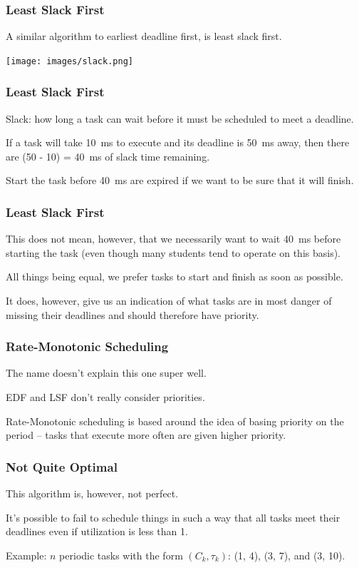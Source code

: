 \begin{frame}
\frametitle{Least Slack First}

A similar algorithm to earliest deadline first, is least slack first.

\begin{center}
	\texttt{[image: images/slack.png]}
\end{center}


\end{frame}

\begin{frame}
\frametitle{Least Slack First}

\alert{Slack}: how long a task can wait before it must be scheduled to meet a deadline.

If a task will take 10~ms to execute and its deadline is 50~ms away, then there are (50 - 10) = 40~ms of slack time remaining.

Start the task before 40~ms are expired if we want to be sure that it will finish. 

\end{frame}

\begin{frame}
\frametitle{Least Slack First}
This does not mean, however, that we necessarily want to wait 40~ms before starting the task (even though many students tend to operate on this basis). 

All things being equal, we prefer tasks to start and finish as soon as possible. 

It does, however, give us an indication of what tasks are in most danger of missing their deadlines and should therefore have priority.

\end{frame}

\begin{frame}
\frametitle{Rate-Monotonic Scheduling}

The name doesn't explain this one super well.

EDF and LSF don't really consider priorities.

Rate-Monotonic scheduling is based around the idea of basing priority on the period -- tasks that execute more often are given higher priority.

\end{frame}

\begin{frame}
\frametitle{Not Quite Optimal}

This algorithm is, however, not perfect.

It's possible to fail to schedule things in such a way that all tasks meet their deadlines even if utilization is less than 1.

Example: $n$ periodic tasks with the form $(C_{k}, \tau _{k})$: (1, 4), (3, 7), and (3, 10).

\end{frame}

